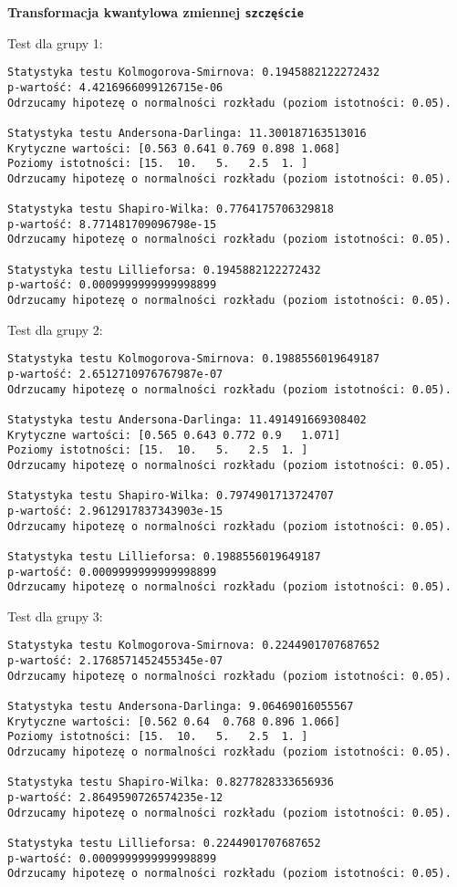 \documentclass[12pt,a4paper]{article}
\begin{document}
\newpage
\begin{center}
    \textbf{Transformacja kwantylowa zmiennej \texttt{szczęście}}
\end{center}
Test dla grupy 1:
\begin{lstlisting}
Statystyka testu Kolmogorova-Smirnova: 0.1945882122272432
p-wartość: 4.4216966099126715e-06
Odrzucamy hipotezę o normalności rozkładu (poziom istotności: 0.05).

Statystyka testu Andersona-Darlinga: 11.300187163513016
Krytyczne wartości: [0.563 0.641 0.769 0.898 1.068]
Poziomy istotności: [15.  10.   5.   2.5  1. ]
Odrzucamy hipotezę o normalności rozkładu (poziom istotności: 0.05).

Statystyka testu Shapiro-Wilka: 0.7764175706329818
p-wartość: 8.771481709096798e-15
Odrzucamy hipotezę o normalności rozkładu (poziom istotności: 0.05).

Statystyka testu Lillieforsa: 0.1945882122272432
p-wartość: 0.0009999999999998899
Odrzucamy hipotezę o normalności rozkładu (poziom istotności: 0.05).
\end{lstlisting}
Test dla grupy 2:
\begin{lstlisting}
Statystyka testu Kolmogorova-Smirnova: 0.1988556019649187
p-wartość: 2.6512710976767987e-07
Odrzucamy hipotezę o normalności rozkładu (poziom istotności: 0.05).

Statystyka testu Andersona-Darlinga: 11.491491669308402
Krytyczne wartości: [0.565 0.643 0.772 0.9   1.071]
Poziomy istotności: [15.  10.   5.   2.5  1. ]
Odrzucamy hipotezę o normalności rozkładu (poziom istotności: 0.05).

Statystyka testu Shapiro-Wilka: 0.7974901713724707
p-wartość: 2.9612917837343903e-15
Odrzucamy hipotezę o normalności rozkładu (poziom istotności: 0.05).

Statystyka testu Lillieforsa: 0.1988556019649187
p-wartość: 0.0009999999999998899
Odrzucamy hipotezę o normalności rozkładu (poziom istotności: 0.05).
\end{lstlisting}
Test dla grupy 3:
\begin{lstlisting}
Statystyka testu Kolmogorova-Smirnova: 0.2244901707687652
p-wartość: 2.1768571452455345e-07
Odrzucamy hipotezę o normalności rozkładu (poziom istotności: 0.05).

Statystyka testu Andersona-Darlinga: 9.06469016055567
Krytyczne wartości: [0.562 0.64  0.768 0.896 1.066]
Poziomy istotności: [15.  10.   5.   2.5  1. ]
Odrzucamy hipotezę o normalności rozkładu (poziom istotności: 0.05).

Statystyka testu Shapiro-Wilka: 0.8277828333656936
p-wartość: 2.8649590726574235e-12
Odrzucamy hipotezę o normalności rozkładu (poziom istotności: 0.05).

Statystyka testu Lillieforsa: 0.2244901707687652
p-wartość: 0.0009999999999998899
Odrzucamy hipotezę o normalności rozkładu (poziom istotności: 0.05).
\end{lstlisting}
\end{document}
